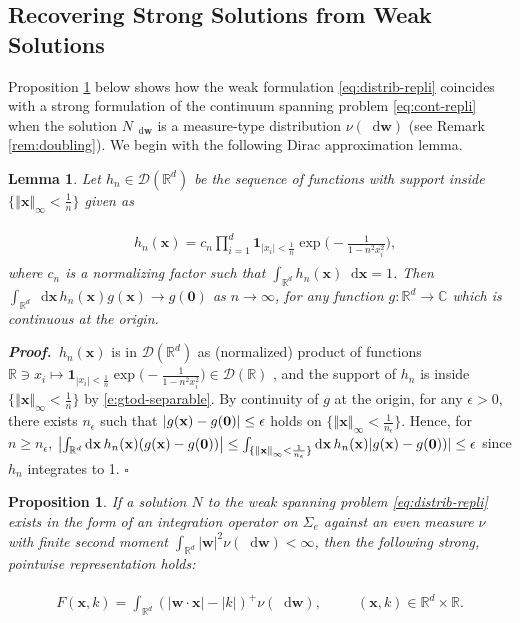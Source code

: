 \documentclass[11pt,A4,twoside]{article}
\newcommand\ind{\mathbf{1}}
\numberwithin{equation}{section}
\renewcommand{\b}[1]{{\color{blue}#1}}
\renewcommand{\vec}{\mathbf}
\renewcommand*\d{\mathop{}\!\mathrm{d}}
\newcommand{\norm}[1]{\left|#1 \right|}
\newcommand{\Norm}[1]{\left\Vert#1 \right\Vert}
\newcommand{\x}{\mathbf{x}}
\newcommand{\z}{\mathbf{z}}
\newcommand{\w}{\mathbf{w}}
\newcommand{\R}{\mathbbm{R}}
\newcommand{\D}{\mathcal{D}}
\newcommand{\M}{\Sigma}
\def\qqq{\;\;\;\;\;\;\;\;\;}
\newcommand{\beqa}{\begin{eqnarray}}
\newcommand{\eeqa}{\end{eqnarray}}
\def\bal{\begin{aligned}}
\def\eal{\end{aligned}}
\def\bll#1{
\beqa\label{#1}\bal
}\def\lel{\eal\eeqa}
\newcommand{\beql}[1]{\bll{#1}}
\newcommand{\eeql}{\lel}
\newtheorem{proposition}[theorem]{Proposition}
\newtheorem{lemma}[theorem]{Lemma}
\theoremstyle{definition}
\theoremstyle{remark}
\def\z{\vec z}
\def\R{\mathbb{R}}
\def\finproof {$\Box$ \vskip 5 pt }\def\finproof{\rule{4pt}{6pt}}\def\finproof{\ensuremath{\square}}
\def\proof{\noindent \emph{\textbf{Proof.} $\, $}}
\def\theh{\b{h}}\def\theh{h}
\begin{document}
\subsection{Recovering Strong Solutions from Weak Solutions}

Proposition \ref{t:S0} below shows how the weak formulation \eqref{eq:distrib-repli} coincides with a strong formulation of the continuum spanning problem \eqref{eq:cont-repli} when the solution $N_{\d\w}$ is a measure-type distribution $\nu(\d\w)$  (see Remark \ref{rem:doubling}).  We begin with the following Dirac approximation lemma.

{\def\z{\x}  
\begin{lemma}\label{l:dd}
Let $\theh_n \in  \D(\R^d)$ be the sequence of functions with support inside $\{\Norm{\z}_\infty < \frac{1}{n}\}$ given as
\beql{e:gtod-separable} 
&\theh_n(\z) = c_n \prod_{i=1}^d  
     \ind_{\norm{x_i}<\frac{1}{n}} \exp\Big(-\frac{1}{1-n^2 x_i ^2}\Big), 
\eeql
where $c_n$ is a  normalizing factor such that $\int_{\R^d}\theh_n(\z)\d \z = 1$. Then  $\int_{\R^d} \d\z\,  h_n(\z) g(\z)  \to g(\mathbf 0) $ as $n \to \infty$, for any function $g: \R^d \to \mathbb C$ which is continuous at the origin. 
\end{lemma}
\proof  $h_n(\x)$ is in $\D(\R^d)$ as (normalized) product of functions $\R\ni x_i\mapsto\ind_{\norm{x_i}<\frac{1}{n}} \exp\Big(-\frac{1}{1-n^2 x_i ^2}\Big) \in \D(\R)$
\citep[Lemma 2 page 181]{kanwal}, and the support of $\theh_n  $ is inside $\{\Norm{\z}_\infty < \frac{1}{n}\}$ by \eqref{e:gtod-separable}.
By continuity of $g$ at the origin, for any $\epsilon>0,$  there exists $n_\epsilon$ such that
$| g(\z)- g({\bf 0})| \le \epsilon$  holds on $ \{\Norm{\z}_\infty < \frac{1}{n_\epsilon}\}$. Hence, for $n\ge n_\epsilon$, 
$\left|\int_{\R^d} \d\z\,  h_n(\z)( g(\z)-g({\bf 0})) \right|\le \int_{\{\Norm{\z}_\infty < \frac{1}{n_\epsilon}\}} \d\z\,  h_n(\z) | g(\z)-g({\bf 0}))| \le \epsilon $ since $h_n$ integrates to 1.
\finproof


\begin{proposition}\label{t:S0} 
If a solution $N$ to the weak spanning problem \eqref{eq:distrib-repli} exists 
in the form of an integration operator on $\M_e$ against an even measure $\nu$ with finite second moment $\int_{\R^d} | \w|^2   \nu(\d\w) <\infty$, 
then the following strong, pointwise representation holds:
\beql{e:Fstrong}
    F(\x , k ) 
    =
   \int_{\R^d} (|\w\cdot\x|  - |k| )^+ \nu(\d\w), \qqq (\x, k ) \in\R^{d}\times \R.
\eeql 
\end{proposition}

}
\end{document}
